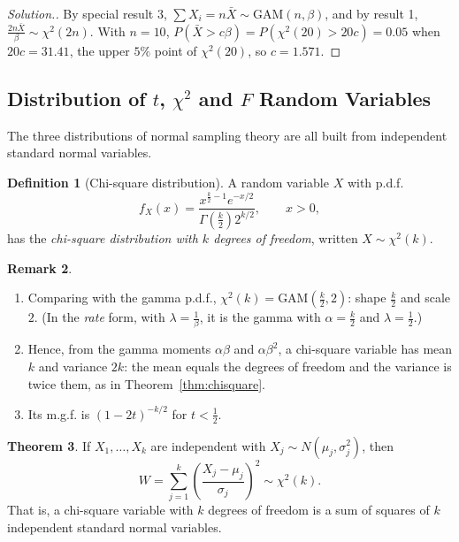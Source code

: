 \documentclass[12pt,a4paper]{report}
\theoremstyle{definition}
\newtheorem{thm}{Theorem}[section]
\newtheorem{definition}[thm]{Definition}
\newtheorem{remark}[thm]{Remark}
\theoremstyle{plain}
\newenvironment{solution}
  {\renewcommand{\qedsymbol}{}\begin{proof}[\textit{Solution}.]}
  {\end{proof}}
\begin{document}
\begin{solution}
By special result 3, $\sum X_i = n\bar X\sim\text{GAM}(n,\beta)$, and by result 1,
$\frac{2n\bar X}{\beta}\sim\chi^2(2n)$. With $n = 10$, $P(\bar X>c\beta) =
P\left(\chi^2(20)>20c\right) = 0.05$ when $20c = 31.41$, the upper $5\%$ point of
$\chi^2(20)$, so $c = 1.571$.
\end{solution}

\subsection{Distribution of $t$, $\chi^2$ and $F$ Random Variables}

The three distributions of normal sampling theory are all built from independent
standard normal variables.

\begin{definition}[Chi-square distribution]
\label{def:chisquare}
A random variable $X$ with p.d.f.
\[f_X(x) = \frac{x^{\frac{k}{2}-1}e^{-x/2}}{\Gamma\left(\frac{k}{2}\right)
2^{k/2}} ,\qquad x>0,\]
has the \emph{chi-square distribution with $k$ degrees of freedom}, written
$X\sim\chi^2(k)$.
\end{definition}

\begin{remark}
\begin{enumerate}
\item Comparing with the gamma p.d.f., $\chi^2(k) = \text{GAM}\left(\frac k2,
2\right)$: shape $\frac k2$ and scale $2$. (In the \emph{rate} form, with
$\lambda = \frac1\beta$, it is the gamma with $\alpha = \frac k2$ and
$\lambda = \frac12$.)
\item Hence, from the gamma moments $\alpha\beta$ and $\alpha\beta^2$, a
chi-square variable has mean $k$ and variance $2k$: the mean equals the degrees
of freedom and the variance is twice them, as in Theorem~\ref{thm:chisquare}.
\item Its m.g.f. is $(1 - 2t)^{-k/2}$ for $t<\frac12$.
\end{enumerate}
\end{remark}

\begin{thm}
\label{thm:chisquaresum}
If $X_1, \dots, X_k$ are independent with $X_j\sim N(\mu_j, \sigma^2_j)$, then
\[W = \sum^k_{j=1}\left(\frac{X_j - \mu_j}{\sigma_j}\right)^2 \sim\chi^2(k).\]
That is, a chi-square variable with $k$ degrees of freedom is a sum of squares of
$k$ independent standard normal variables.
\end{thm}
\end{document}
